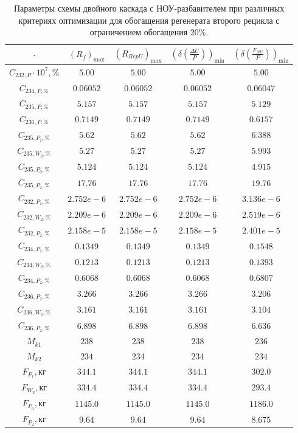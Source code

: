 \begin{table}
    \centering
    \begin{tabular}{|c|cccc|}
        \hline $\cdot$ & $(R_f)_\text{max}$ & $(R_{RepU})_\text{max}$ & $(\delta(\frac{\Delta U}{P}))_\text{min}$ & $(\delta(\frac{F_{NU}}{P}))_\text{min}$\\ \hline
    $C_{232,P}\cdot10^{7}, \%$ & $5.00$ & $5.00$ & $5.00$ & $5.00$\\ \hline
    $C_{234,P, \%}$ & $0.06052$ & $0.06052$ & $0.06052$ & $0.06047$\\ \hline
    $C_{235,P, \%}$ & $5.157$ & $5.157$ & $5.157$ & $5.129$\\ \hline
    $C_{236,P, \%}$ & $0.7149$ & $0.7149$ & $0.7149$ & $0.6157$\\ \hline
    $C_{235,P_1, \%}$ & $5.62$ & $5.62$ & $5.62$ & $6.388$\\ \hline
    $C_{235,W_2, \%}$ & $5.27$ & $5.27$ & $5.27$ & $5.993$\\ \hline
    $C_{235,P_0, \%}$ & $5.124$ & $5.124$ & $5.124$ & $4.915$\\ \hline
    $C_{235,P_2, \%}$ & $17.76$ & $17.76$ & $17.76$ & $19.76$\\ \hline
    $C_{232,P_1, \%}$ & $2.752e-6$ & $2.752e-6$ & $2.752e-6$ & $3.136e-6$\\ \hline
    $C_{232,W_2, \%}$ & $2.209e-6$ & $2.209e-6$ & $2.209e-6$ & $2.519e-6$\\ \hline
    $C_{232,P_2, \%}$ & $2.158e-5$ & $2.158e-5$ & $2.158e-5$ & $2.401e-5$\\ \hline
    $C_{234,P_1, \%}$ & $0.1349$ & $0.1349$ & $0.1349$ & $0.1548$\\ \hline
    $C_{234,W_2, \%}$ & $0.1213$ & $0.1213$ & $0.1213$ & $0.1393$\\ \hline
    $C_{234,P_2, \%}$ & $0.6068$ & $0.6068$ & $0.6068$ & $0.6807$\\ \hline
    $C_{236,P_1, \%}$ & $3.266$ & $3.266$ & $3.266$ & $3.206$\\ \hline
    $C_{236,W_2, \%}$ & $3.161$ & $3.161$ & $3.161$ & $3.104$\\ \hline
    $C_{236,P_2, \%}$ & $6.898$ & $6.898$ & $6.898$ & $6.636$\\ \hline
    $M_{k1}$ & $238$ & $238$ & $238$ & $236$\\ \hline
    $M_{k2}$ & $234$ & $234$ & $234$ & $234$\\ \hline
    $F_{P_1}, \text{кг}$ & $344.1$ & $344.1$ & $344.1$ & $302.0$\\ \hline
    $F_{W_2}, \text{кг}$ & $334.4$ & $334.4$ & $334.4$ & $293.4$\\ \hline
    $F_{P_0}, \text{кг}$ & $1145.0$ & $1145.0$ & $1145.0$ & $1186.0$\\ \hline
    $F_{P_2}, \text{кг}$ & $9.64$   & $9.64$ & $9.64$ & $8.675$\\ \hline
    \end{tabular}
\caption{Параметры схемы двойного каскада с НОУ-разбавителем при различных критериях оптимизации для обогащения регенерата второго рецикла с ограничением обогащения 20\%.{\label{2opt2_20}}}
\end{table}

